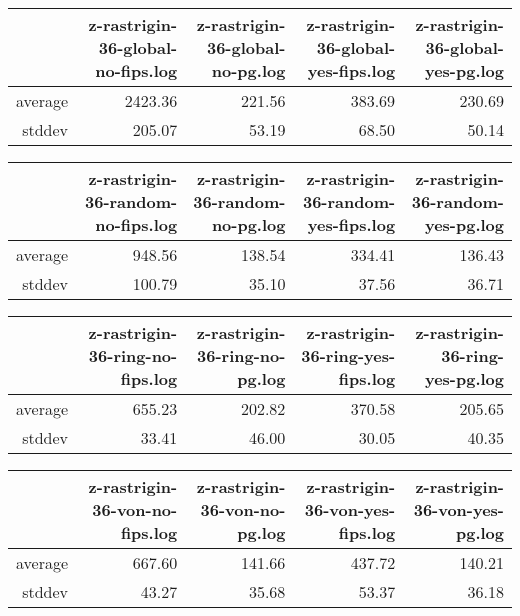 \begin{table}[ht]
\centering
\begin{tabular}{rrrrr}
  \hline
 & z-rastrigin-36-global-no-fips.log & z-rastrigin-36-global-no-pg.log & z-rastrigin-36-global-yes-fips.log & z-rastrigin-36-global-yes-pg.log \\ 
  \hline
average & 2423.36 & 221.56 & 383.69 & 230.69 \\ 
  stddev & 205.07 & 53.19 & 68.50 & 50.14 \\ 
   \hline
\end{tabular}
\end{table}
\begin{table}[ht]
\centering
\begin{tabular}{rrrrr}
  \hline
 & z-rastrigin-36-random-no-fips.log & z-rastrigin-36-random-no-pg.log & z-rastrigin-36-random-yes-fips.log & z-rastrigin-36-random-yes-pg.log \\ 
  \hline
average & 948.56 & 138.54 & 334.41 & 136.43 \\ 
  stddev & 100.79 & 35.10 & 37.56 & 36.71 \\ 
   \hline
\end{tabular}
\end{table}
\begin{table}[ht]
\centering
\begin{tabular}{rrrrr}
  \hline
 & z-rastrigin-36-ring-no-fips.log & z-rastrigin-36-ring-no-pg.log & z-rastrigin-36-ring-yes-fips.log & z-rastrigin-36-ring-yes-pg.log \\ 
  \hline
average & 655.23 & 202.82 & 370.58 & 205.65 \\ 
  stddev & 33.41 & 46.00 & 30.05 & 40.35 \\ 
   \hline
\end{tabular}
\end{table}
\begin{table}[ht]
\centering
\begin{tabular}{rrrrr}
  \hline
 & z-rastrigin-36-von-no-fips.log & z-rastrigin-36-von-no-pg.log & z-rastrigin-36-von-yes-fips.log & z-rastrigin-36-von-yes-pg.log \\ 
  \hline
average & 667.60 & 141.66 & 437.72 & 140.21 \\ 
  stddev & 43.27 & 35.68 & 53.37 & 36.18 \\ 
   \hline
\end{tabular}
\end{table}
